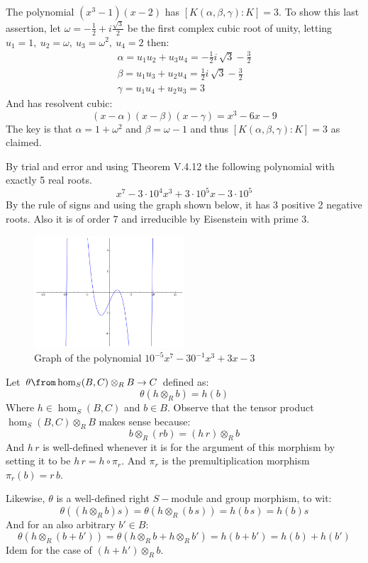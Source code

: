 The polynomial $(x^3-1)(x-2)$ has $[K(\alpha,\beta,\gamma):K]=3$. To show this last assertion, let $\omega= -\frac 12 +i\frac{\sqrt 3}{2}$ be the first complex cubic root of unity, letting $u_1=1,\ u_2=\omega,\ u_3=\omega^2,\ u_4=2$ then:
\begin{gather*}
    \alpha = u_1u_2 + u_3u_4 = -\frac{1}{2} i \, \sqrt{3} - \frac{3}{2}\\
    \beta = u_1u_3 + u_2u_4 = \frac{1}{2} i \, \sqrt{3} - \frac{3}{2}\\
    \gamma = u_1u_4 + u_2u_3 =3
\end{gather*}
And has resolvent cubic:
$$(x-\alpha)(x-\beta)(x-\gamma)= x^3 - 6x - 9$$
The key is that $\alpha=1+\omega^2$ and $\beta=\omega-1$ and thus $[K(\alpha,\beta,\gamma):K]=3$ as claimed. 

By trial and error and using Theorem V.4.12 the following polynomial with exactly 5 real roots. 
$$x^7-3\cdot10^{4}x^3 + 3\cdot 10^5x- 3\cdot 10^5$$
By the rule of signs and using the graph shown below, it has 3 positive 2 negative roots. Also it is of order 7 and irreducible by Eisenstein with prime 3.
    \begin{figure}[h]
\begin{center}
\includegraphics[width=0.5\textwidth]{sage0.png}
\caption{Graph of the polynomial $10^{-5}x^7-30^{-1}x^3 + 3x- 3$}
\end{center}
\end{figure}

Let $\theta \from \hom_S(B,C)\otimes_R B \to C$ defined as:
$$\theta (h\otimes_R b)= h(b)$$
Where $h\in \hom_S(B,C)$ and $b\in B$. Observe that the tensor product  $\hom_S(B,C) \otimes_R B$ makes sense because:
$$b \otimes_R(rb) = (h\, r) \otimes_ R b$$
And $h\,r$ is well-defined whenever it is for the argument of this morphism by setting it to be $h\, r =h \circ \pi_r$. And $\pi_r$ is the premultiplication morphism $\pi_r(b)=r\, b$.

Likewise, $\theta$ is a well-defined right $S-$module and group morphism, to wit:
$$\theta((h \otimes_ R b)s)=\theta(h \otimes_ R (b\, s))=h(b\, s)= h(b)s$$
And for an also arbitrary $b'\in B$:
$$\theta(h \otimes_ R (b+b'))=\theta(h \otimes_ R b+ h \otimes_ R b')=h(b+b')=h(b)+h(b')$$
Idem for the case of $(h+h')  \otimes_ R b$.

